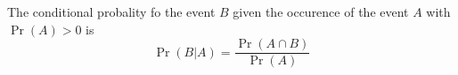 The conditional probality fo the event $B$ given the occurence of the event $A$ with $\operatorname{Pr}(A) > 0$ is
$$\operatorname{Pr}(B | A) = \frac{\operatorname{Pr}(A \cap B)}{\operatorname{Pr}(A)}$$
